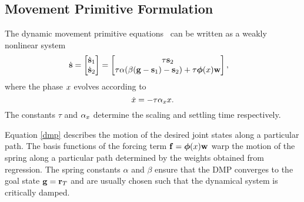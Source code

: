 \subsection{Movement Primitive Formulation}
The dynamic movement primitive equations~\cite{Kober08} can be written as a weakly nonlinear system 
%
\begin{equation}
\begin{aligned}
\dot{\boldsymbol{\mathrm{s}}} &= \begin{bmatrix}
   \dot{\boldsymbol{\mathrm{s}}}_1 \\
   \dot{\boldsymbol{\mathrm{s}}}_2
 \end{bmatrix} = \begin{bmatrix}
    \tau \boldsymbol{\mathrm{s}}_2  \\
    \tau \alpha (\beta(\boldsymbol{\mathrm{g}} - \boldsymbol{\mathrm{s}}_1) - \boldsymbol{\mathrm{s}}_2) + \tau \boldsymbol{\mathrm{\phi}}(x)\boldsymbol{\mathrm{w}}
  \end{bmatrix}
\label{dmp},
\end{aligned}
\end{equation}
%
\noindent where the phase $x$ evolves according to
%
\begin{equation}
\dot{x} = -\tau\alpha_{x}x.
\label{phase}
\end{equation}
%
\noindent The constants $\tau$ and $\alpha_{x}$ determine the scaling and settling time respectively. 

Equation \eqref{dmp} describes the motion of the desired joint states along a particular path. The basis functions of the forcing term $\boldsymbol{\mathrm{f}} = \boldsymbol{\mathrm{\phi}}(x)\boldsymbol{\mathrm{w}}$ warp the motion of the spring along a particular path determined by the weights obtained from regression. The spring constants $\alpha$ and $\beta$ ensure that the DMP converges to the goal state $\boldsymbol{\mathrm{g}} = \boldsymbol{\mathrm{r}}_T$ and are usually chosen such that the dynamical system is critically damped.

